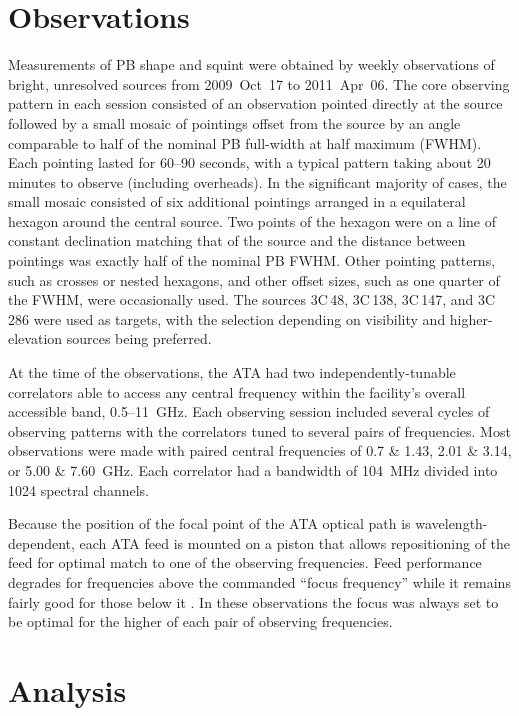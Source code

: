 \documentclass[preprint]{aastex}
\begin{document}
\section{Observations}\label{s.observations}

Measurements of PB shape and squint were obtained by weekly
observations of bright, unresolved sources from 2009~Oct~17 to
2011~Apr~06. The core observing pattern in each session consisted of
an observation pointed directly at the source followed by a small
mosaic of pointings offset from the source by an angle comparable to
half of the nominal PB full-width at half maximum (FWHM). Each
pointing lasted for 60--90 seconds, with a typical pattern taking
about 20 minutes to observe (including overheads). In the significant
majority of cases, the small mosaic consisted of six additional
pointings arranged in a equilateral hexagon around the central
source. Two points of the hexagon were on a line of constant
declination matching that of the source and the distance between
pointings was exactly half of the nominal PB FWHM. Other pointing
patterns, such as crosses or nested hexagons, and other offset sizes,
such as one quarter of the FWHM, were occasionally used.  The sources
3C\,48, 3C\,138, 3C\,147, and 3C\,286 were used as targets, with the
selection depending on visibility and higher-elevation sources being
preferred.

At the time of the observations, the ATA had two independently-tunable
correlators able to access any central frequency within the facility's
overall accessible band, 0.5--11~GHz. Each observing session included
several cycles of observing patterns with the correlators tuned to
several pairs of frequencies. Most observations were made with paired
central frequencies of 0.7 \& 1.43, 2.01 \& 3.14, or 5.00 \&
7.60~GHz. Each correlator had a bandwidth of 104~MHz divided into 1024
spectral channels.

Because the position of the focal point of the ATA optical path is
wavelength-dependent, each ATA feed is mounted on a piston that allows
repositioning of the feed for optimal match to one of the observing
frequencies. Feed performance degrades for frequencies above the
commanded ``focus frequency'' while it remains fairly good for those
below it \citep{Harp2011}. In these observations the focus was always
set to be optimal for the higher of each pair of observing
frequencies.

\section{Analysis}\label{s.reduction}
\end{document}
